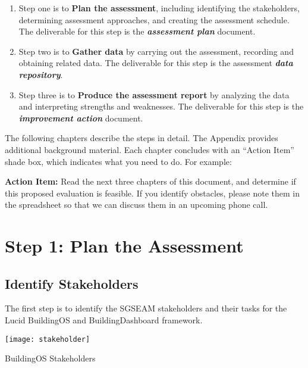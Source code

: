 \begin{enumerate}
\item Step one is to {\bf Plan the assessment}, including
 identifying the stakeholders, determining assessment approaches, and creating the assessment schedule. 
 The deliverable for this step is the \textbf{\textit{assessment
     plan}} document. 

\item Step two is to {\bf Gather data} by carrying out 
 the assessment, recording and obtaining related data. The deliverable for this step is the 
 assessment \textbf{\textit{data repository}}. 

\item Step three is to {\bf Produce the assessment report} by analyzing 
 the data and interpreting strengths and weaknesses. The deliverable
 for this step is the \textbf{\textit{improvement action}} document.

\end{enumerate}

The following chapters describe the steps in detail. The Appendix
provides additional background material. Each chapter concludes with
an ``Action Item'' shade box, which indicates what you need to do. For
example:


\begin{shadebox}
{\bf Action Item:} Read the next three chapters of this document, and determine if this proposed
evaluation is feasible. If you identify obstacles, please note them
in the spreadsheet so that we can discuss them in an upcoming phone call.
\end{shadebox}


\section{Step 1: Plan the Assessment}

\subsection{Identify Stakeholders}

The first step is to identify the SGSEAM stakeholders and their tasks
for the Lucid BuildingOS and BuildingDashboard
framework. 

\begin{table}[ht!]
  \center
  \texttt{[image: stakeholder]}
  \caption{BuildingOS Stakeholders}
  \label{table:lucid-stakeholders}
\end{table}

